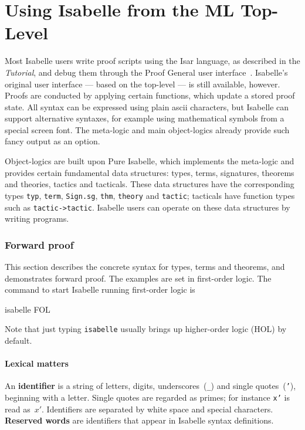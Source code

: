 \part{Using Isabelle from the ML Top-Level}\label{chap:getting}

Most Isabelle users write proof scripts using the Isar language, as described in the \emph{Tutorial}, and debug them through the Proof General user interface~\cite{proofgeneral}. Isabelle's original user interface --- based on the \ML{} top-level --- is still available, however.  
Proofs are conducted by
applying certain \ML{} functions, which update a stored proof state.
All syntax can be expressed using plain {\sc ascii}
characters, but Isabelle can support
alternative syntaxes, for example using mathematical symbols from a
special screen font.  The meta-logic and main object-logics already
provide such fancy output as an option.

Object-logics are built upon Pure Isabelle, which implements the
meta-logic and provides certain fundamental data structures: types,
terms, signatures, theorems and theories, tactics and tacticals.
These data structures have the corresponding \ML{} types \texttt{typ},
\texttt{term}, \texttt{Sign.sg}, \texttt{thm}, \texttt{theory} and \texttt{tactic};
tacticals have function types such as \texttt{tactic->tactic}.  Isabelle
users can operate on these data structures by writing \ML{} programs.


\section{Forward proof}\label{sec:forward} 
This section describes the concrete syntax for types, terms and theorems,
and demonstrates forward proof.  The examples are set in first-order logic.
The command to start Isabelle running first-order logic is
\begin{ttbox}
isabelle FOL
\end{ttbox}
Note that just typing \texttt{isabelle} usually brings up higher-order logic
(HOL) by default.


\subsection{Lexical matters}
An {\bf identifier} is a string of letters, digits, underscores~(\verb|_|)
and single quotes~({\tt'}), beginning with a letter.  Single quotes are
regarded as primes; for instance \texttt{x'} is read as~$x'$.  Identifiers are
separated by white space and special characters.  {\bf Reserved words} are
identifiers that appear in Isabelle syntax definitions.

